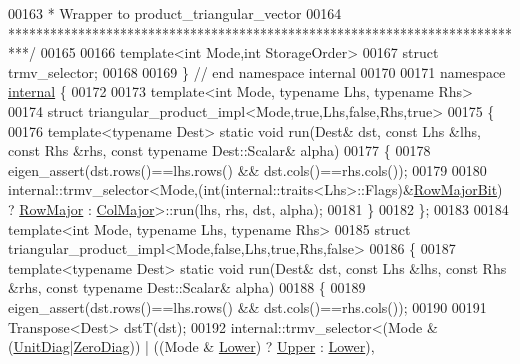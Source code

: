 \begin{DoxyCode}
00163 \textcolor{comment}{* Wrapper to product\_triangular\_vector}
00164 \textcolor{comment}{***************************************************************************/}
00165 
00166 \textcolor{keyword}{template}<\textcolor{keywordtype}{int} Mode,\textcolor{keywordtype}{int} StorageOrder>
00167 \textcolor{keyword}{struct }trmv\_selector;
00168 
00169 \} \textcolor{comment}{// end namespace internal}
00170 
00171 \textcolor{keyword}{namespace }\hyperlink{namespaceinternal}{internal} \{
00172 
00173 \textcolor{keyword}{template}<\textcolor{keywordtype}{int} Mode, \textcolor{keyword}{typename} Lhs, \textcolor{keyword}{typename} Rhs>
00174 \textcolor{keyword}{struct }triangular\_product\_impl<Mode,true,Lhs,false,Rhs,true>
00175 \{
00176   \textcolor{keyword}{template}<\textcolor{keyword}{typename} Dest> \textcolor{keyword}{static} \textcolor{keywordtype}{void} run(Dest& dst, \textcolor{keyword}{const} Lhs &lhs, \textcolor{keyword}{const} Rhs &rhs, \textcolor{keyword}{const} \textcolor{keyword}{typename} 
      Dest::Scalar& alpha)
00177   \{
00178     eigen\_assert(dst.rows()==lhs.rows() && dst.cols()==rhs.cols());
00179   
00180     internal::trmv\_selector<Mode,(int(internal::traits<Lhs>::Flags)&\hyperlink{group__flags_gae4f56c2a60bbe4bd2e44c5b19cbe8762}{RowMajorBit}) ? 
      \hyperlink{group__enums_ggaacded1a18ae58b0f554751f6cdf9eb13acfcde9cd8677c5f7caf6bd603666aae3}{RowMajor} : \hyperlink{group__enums_ggaacded1a18ae58b0f554751f6cdf9eb13a0cbd4bdd0abcfc0224c5fcb5e4f6669a}{ColMajor}>::run(lhs, rhs, dst, alpha);
00181   \}
00182 \};
00183 
00184 \textcolor{keyword}{template}<\textcolor{keywordtype}{int} Mode, \textcolor{keyword}{typename} Lhs, \textcolor{keyword}{typename} Rhs>
00185 \textcolor{keyword}{struct }triangular\_product\_impl<Mode,false,Lhs,true,Rhs,false>
00186 \{
00187   \textcolor{keyword}{template}<\textcolor{keyword}{typename} Dest> \textcolor{keyword}{static} \textcolor{keywordtype}{void} run(Dest& dst, \textcolor{keyword}{const} Lhs &lhs, \textcolor{keyword}{const} Rhs &rhs, \textcolor{keyword}{const} \textcolor{keyword}{typename} 
      Dest::Scalar& alpha)
00188   \{
00189     eigen\_assert(dst.rows()==lhs.rows() && dst.cols()==rhs.cols());
00190 
00191     Transpose<Dest> dstT(dst);
00192     internal::trmv\_selector<(Mode & (\hyperlink{group__enums_gga39e3366ff5554d731e7dc8bb642f83cdaddb72f888ac85d5a1c52333e54f9374b}{UnitDiag}|\hyperlink{group__enums_gga39e3366ff5554d731e7dc8bb642f83cda884ff7240392e85aa6e4b3c957e36483}{ZeroDiag})) | ((Mode & 
      \hyperlink{group__enums_gga39e3366ff5554d731e7dc8bb642f83cda891792b8ed394f7607ab16dd716f60e6}{Lower}) ? \hyperlink{group__enums_gga39e3366ff5554d731e7dc8bb642f83cda6bcb58be3b8b8ec84859ce0c5ac0aaec}{Upper} : \hyperlink{group__enums_gga39e3366ff5554d731e7dc8bb642f83cda891792b8ed394f7607ab16dd716f60e6}{Lower}),

\end{DoxyCode}
